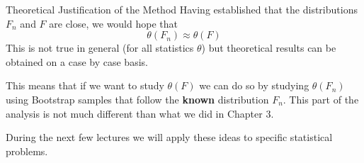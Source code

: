 \documentclass[8pt]{beamer}
\begin{document}
\begin{frame}{Theoretical Justification of the Method}
Having established that the distributions $F_n$ and $F$ are close, we would hope that 
\begin{equation*}
\theta(F_n) \approx \theta(F)
\end{equation*}
This is not true in general (for all statistics $\theta$) but theoretical results can be obtained on a case by case basis. 

\vspace{2mm}
  
This means that if we want to study $\theta(F)$ we can do so by studying  $\theta(F_n)$ using Bootstrap samples that follow the {\bf known} distribution $F_n$. This part of the analysis is not much different than what we did in Chapter 3.
 
\vspace{2mm}
   
During the next few lectures we will apply these ideas to specific  statistical problems.
\end{frame}
\end{document}
